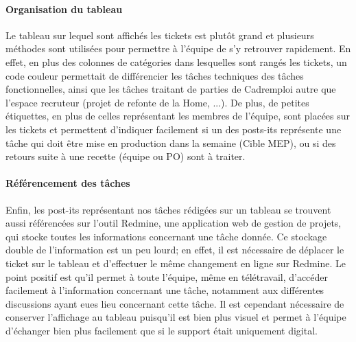 \paragraph{Organisation du tableau}
Le tableau sur lequel sont affichés les tickets est plutôt grand et plusieurs méthodes sont utilisées pour permettre à l'équipe de s'y retrouver rapidement.
En effet, en plus des colonnes de catégories dans lesquelles sont rangés les tickets, un code couleur permettait de différencier les tâches techniques des tâches fonctionnelles, ainsi que les tâches traitant de parties de Cadremploi autre que l'espace recruteur (projet de refonte de la Home, ...).
De plus, de petites étiquettes, en plus de celles représentant les membres de l'équipe, sont placées sur les tickets et permettent d'indiquer facilement si un des posts-its représente une tâche qui doit être mise en production dans la semaine (Cible MEP), ou si des retours suite à une recette (équipe ou PO) sont à traiter.
\paragraph{Référencement des tâches}
Enfin, les post-its représentant nos tâches rédigées sur un tableau se trouvent aussi référencées sur l'outil Redmine, une application web de gestion de projets, qui stocke toutes les informations concernant une tâche donnée.
Ce stockage double de l'information est un peu lourd; en effet, il est nécessaire de déplacer le ticket sur le tableau et d'effectuer le même changement en ligne sur Redmine.
Le point positif est qu'il permet à toute l'équipe, même en télétravail, d'accéder facilement à l'information concernant une tâche, notamment aux différentes discussions ayant eues lieu concernant cette tâche.
Il est cependant nécessaire de conserver l'affichage au tableau puisqu'il est bien plus visuel et permet à l'équipe d'échanger bien plus facilement que si le support était uniquement digital.
